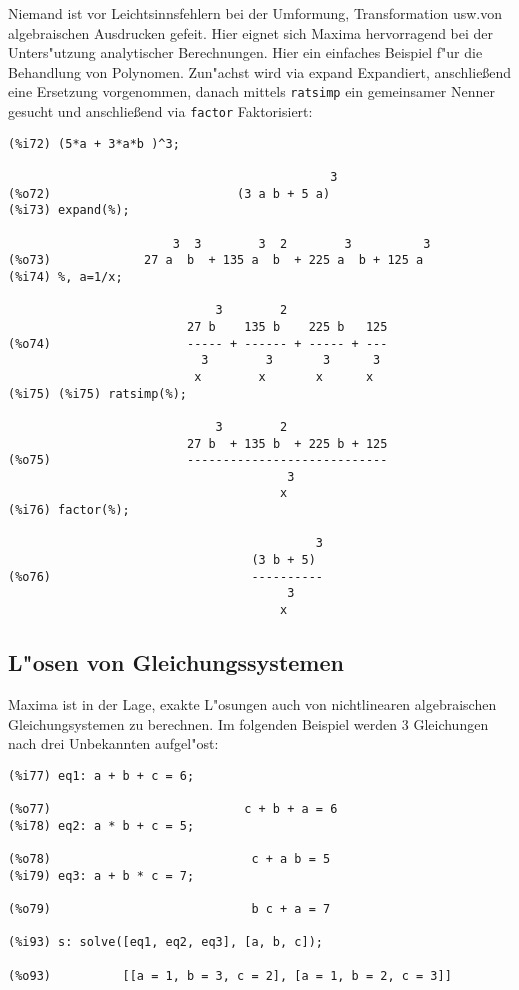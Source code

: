 \documentclass[ngerman,12pt,a4paper]{article}
\begin{document}
Niemand ist vor Leichtsinnsfehlern bei der Umformung, Transformation usw.\@ von algebraischen Ausdrucken gefeit. Hier eignet sich Maxima hervorragend bei der Unters"utzung analytischer Berechnungen.
Hier ein einfaches Beispiel f"ur die Behandlung von Polynomen. Zun"achst wird via expand Expandiert, anschlie{\ss}end eine Ersetzung vorgenommen, danach mittels \verb|ratsimp| ein gemeinsamer Nenner gesucht und anschlie{\ss}end via \verb|factor| Faktorisiert:

\scriptsize
\begin{verbatim}
(%i72) (5*a + 3*a*b )^3;

                                             3
(%o72)                          (3 a b + 5 a)
(%i73) expand(%);

                       3  3        3  2        3          3
(%o73)             27 a  b  + 135 a  b  + 225 a  b + 125 a
(%i74) %, a=1/x;

                             3        2
                         27 b    135 b    225 b   125
(%o74)                   ----- + ------ + ----- + ---
                           3        3       3      3
                          x        x       x      x
(%i75) (%i75) ratsimp(%);

                             3        2
                         27 b  + 135 b  + 225 b + 125
(%o75)                   ----------------------------
                                       3
                                      x
(%i76) factor(%);

                                           3
                                  (3 b + 5)
(%o76)                            ----------
                                       3
                                      x
\end{verbatim}
\normalsize


\subsection{L"osen von Gleichungssystemen}

Maxima ist in der Lage, exakte L"osungen auch von nichtlinearen algebraischen Gleichungsystemen zu berechnen. Im folgenden Beispiel werden 3 Gleichungen nach drei Unbekannten aufgel"ost:

\scriptsize
\begin{verbatim}
(%i77) eq1: a + b + c = 6;

(%o77)                           c + b + a = 6
(%i78) eq2: a * b + c = 5;

(%o78)                            c + a b = 5
(%i79) eq3: a + b * c = 7;

(%o79)                            b c + a = 7

(%i93) s: solve([eq1, eq2, eq3], [a, b, c]);

(%o93)          [[a = 1, b = 3, c = 2], [a = 1, b = 2, c = 3]]
\end{verbatim}
\normalsize
\end{document}
